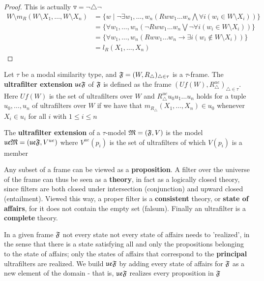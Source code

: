 \documentclass[11pt]{article}
\newcommand{\ue}{\fu\fe}
\begin{document}
\begin{proof}
This is actually \(\triangledown=\neg\triangle\neg\)
\begin{align*}
W\setminus m_R(W\setminus X_1,\dots,W\setminus X_n)&=
\{w\mid\neg\exists w_1,\dots,w_n(Rww_1\dots w_n\bigwedge\forall i(w_i\in W\setminus X_i))\}\\
&=\{\forall w_1,\dots,w_n(\neg Rww_1\dots w_n\bigvee\neg\forall i(w_i\in W\setminus X_i))\}\\
&=\{\forall w_1,\dots,w_n(Rww_1\dots w_n\to\exists i(w_i\not\in W\setminus X_i))\}\\
&=l_R(X_1,\dots,X_n)
\end{align*}
\end{proof}
\begin{definition}
Let \(\tau\) be a modal similarity type, and
\(\mathfrak{F}=(W,R_{\triangle})_{ \triangle\in\tau}\) is a \(\tau\)-frame. The
\textbf{ultrafilter extension} \(\mathfrak{u}\mathfrak{e}\mathfrak{F}\) of \(\mathfrak{F}\) is defined as the frame
\((Uf(W),R_{\triangle}^{ue})_{\triangle\in\tau}\). Here \(Uf(W)\) is the set of
ultrafilters over \(W\) and \(R_{\triangle}^{ue}u_0u_1\dots u_n\) holds for
a tuple \(u_0,\dots,u_n\) of ultrafilters over \(W\) if we have that
\(m_{R_{\triangle}}(X_1,\dots,X_n)\in u_0\) whenever \(X_i\in u_i\) for all
\(i\) with \(1\le i\le n\)

The \textbf{ultrafilter extension} of a \(\tau\)-model \(\mathfrak{M}=(\mathfrak{F},V)\) is the model
\(\mathfrak{u}\mathfrak{e}\mathfrak{M}=(\mathfrak{u}\mathfrak{e}\mathfrak{F},V^{ue})\) where \(V^{ue}(p_i)\) is the set of
ultrafilters of which \(V(p_i)\) is a member
\end{definition}

Any subset of a frame can be viewed as a \textbf{proposition}. A filter over the
universe of the frame can thus be seen as a \textbf{theory}, in fact as a logically
closed theory, since filters are both closed under intersection
(conjunction) and upward closed (entailment). Viewed this way, a proper
filter is a \textbf{consistent} theory, or \textbf{state of affairs},
for it does not contain the empty set (falsum).
Finally an ultrafilter is a \textbf{complete} theory.

In a given frame \(\mathfrak{F}\) not every state not every state of affairs needs to
'realized', in the sense that there is a state satisfying all and only the
propositions belonging to the state of affairs; only the states of affairs
that correspond to the \textbf{principal} ultrafilters are realized. We build
\(\ue\fF\) by adding every state of affairs for \(\mathfrak{F}\) as a new element of
the domain - that is, \(\ue\fF\) realizes every proposition in \(\mathfrak{F}\)
\end{document}
